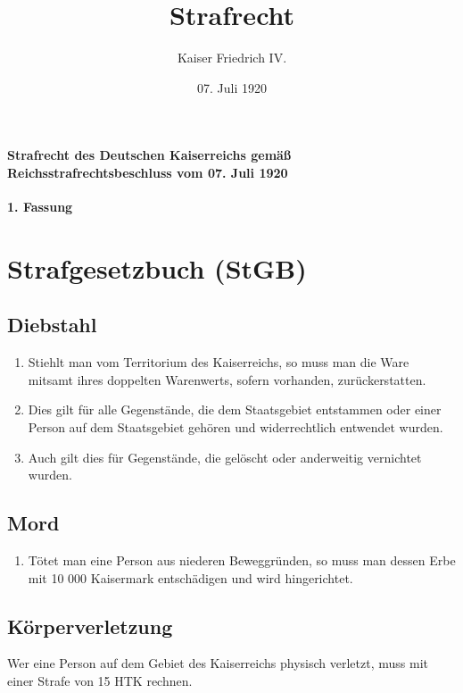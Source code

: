 \documentclass{article}
\title{Strafrecht}
\author{Kaiser Friedrich IV.}
\date{07. Juli 1920}
\begin{document}
\maketitle
\vspace*{\fill}
\paragraph{Strafrecht des Deutschen Kaiserreichs gemäß Reichsstrafrechtsbeschluss vom 07. Juli 1920}

\newpage
{}
\vspace*{\fill}
\begin{Center}
\textbf{1. Fassung}
\vspace*{\fill}
\end{Center}
\newpage
\tableofcontents
\newpage

\section{Strafgesetzbuch (StGB)}
\localtableofcontents
\subsection{Diebstahl}
\begin{enumerate}[(1)]
    \item Stiehlt man vom Territorium des Kaiserreichs, so muss man die Ware mitsamt ihres doppelten Warenwerts, sofern vorhanden, zurückerstatten.
    \item Dies gilt für alle Gegenstände, die dem Staatsgebiet entstammen oder einer Person auf dem Staatsgebiet gehören und widerrechtlich entwendet wurden.
    \item Auch gilt dies für Gegenstände, die gelöscht oder anderweitig vernichtet wurden.
\end{enumerate}

\subsection{Mord}
\begin{enumerate}[(1)]
    \item Tötet man eine Person aus niederen Beweggründen, so muss man dessen Erbe mit 10 000 Kaisermark entschädigen und wird hingerichtet.
\end{enumerate}

\subsection{Körperverletzung}
Wer eine Person auf dem Gebiet des Kaiserreichs physisch verletzt, muss mit einer Strafe von 15 HTK rechnen.
\end{document}
